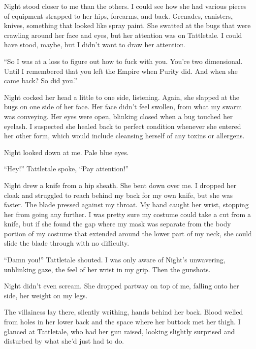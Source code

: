 Night stood closer to me than the others.  I could see how she had various pieces of equipment strapped to her hips, forearms, and back.  Grenades, canisters, knives, something that looked like spray paint.  She swatted at the bugs that were crawling around her face and eyes, but her attention was on Tattletale.  I could have stood, maybe, but I didn't want to draw her attention.



``So I was at a loss to figure out how to fuck with you.  You're two dimensional.  Until I remembered that you left the Empire when Purity did.  And when she came back?  So did you.''



Night cocked her head a little to one side, listening.  Again, she slapped at the bugs on one side of her face.  Her face didn't feel swollen, from what my swarm was conveying.  Her eyes were open, blinking closed when a bug touched her eyelash.  I suspected she healed back to perfect condition whenever she entered her other form, which would include cleansing herself of any toxins or allergens.



Night looked down at me.  Pale blue eyes.



``Hey!'' Tattletale spoke, ``Pay attention!''



Night drew a knife from a hip sheath.  She bent down over me.  I dropped her cloak and struggled to reach behind my back for my own knife, but she was faster.  The blade pressed against my throat.  My hand caught her wrist, stopping her from going any further.  I was pretty sure my costume could take a cut from a knife, but if she found the gap where my mask was separate from the body portion of my costume that extended around the lower part of my neck, she could slide the blade through with no difficulty.



``Damn you!'' Tattletale shouted.  I was only aware of Night's unwavering, unblinking gaze, the feel of her wrist in my grip.  Then the gunshots.



Night didn't even scream.  She dropped partway on top of me, falling onto her side, her weight on my legs.



The villainess lay there, silently writhing, hands behind her back.  Blood welled from holes in her lower back and the space where her buttock met her thigh.  I glanced at Tattletale, who had her gun raised, looking slightly surprised and disturbed by what she'd just had to do.



